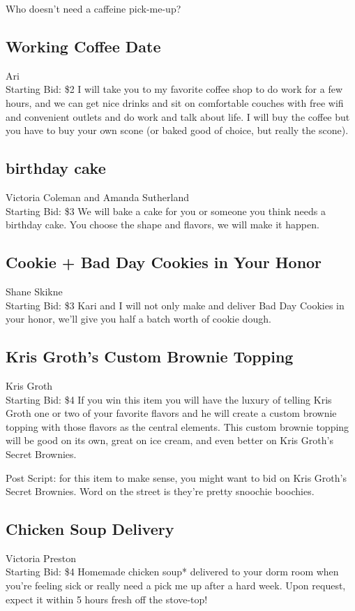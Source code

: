 \documentclass[11pt]{article}
\begin{document}
Who doesn't need a caffeine pick-me-up?
\subsection{Working Coffee Date}
Ari
\\
Starting Bid: \$2
\newline
I will take you to my favorite coffee shop to do work for a few hours, and we can get nice drinks and sit on comfortable couches with free wifi and convenient outlets and do work and talk about life. I will buy the coffee but you have to buy your own scone (or baked good of choice, but really the scone).
\subsection{birthday cake }
Victoria Coleman and Amanda Sutherland
\\
Starting Bid: \$3
\newline
We will bake a cake for you or someone you think needs a birthday cake. You choose the shape and flavors, we will make it happen.
\subsection{Cookie + Bad Day Cookies in Your Honor}
Shane Skikne
\\
Starting Bid: \$3
\newline
Kari and I will not only make and deliver Bad Day Cookies in your honor, we'll give you half a batch worth of cookie dough.
\subsection{Kris Groth's Custom Brownie Topping}
Kris Groth
\\
Starting Bid: \$4
\newline
If you win this item you will have the luxury of telling Kris Groth one or two of your favorite flavors and he will create a custom brownie topping with those flavors as the central elements. This custom brownie topping will be good on its own, great on ice cream, and even better on Kris Groth's Secret Brownies.

Post Script: for this item to make sense, you might want to bid on Kris Groth's Secret Brownies. Word on the street is they're pretty snoochie boochies.
\subsection{Chicken Soup Delivery}
Victoria Preston
\\
Starting Bid: \$4
\newline
Homemade chicken soup* delivered to your dorm room when you're feeling sick or really need a pick me up after a hard week.  Upon request, expect it within 5 hours fresh off the stove-top!
\end{document}
